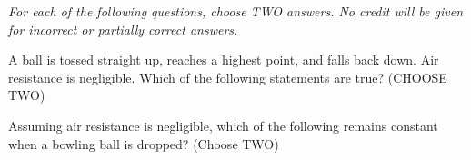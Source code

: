 \documentclass[10pt]{examdesign}
\begin{document}
\begin{multiplechoice}[title={Multiple Correct Multiple Choice},rearrange=no]
	\textit{For each of the following questions, choose \textit{TWO} answers.  No credit will be given for incorrect or partially correct answers.}

\begin{question}
	A ball is tossed straight up, reaches a highest point, and falls back down. Air resistance is negligible.  Which of the following statements are true? (CHOOSE TWO)
\end{question}


\begin{question}
	Assuming air resistance is negligible, which of the following remains constant when a bowling ball is dropped? (Choose TWO)
\end{question}



\end{multiplechoice}
\end{document}
